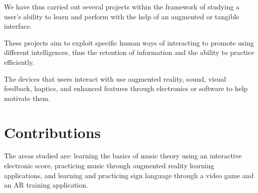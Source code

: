 We have thus carried out several projects within the framework of studying a user's ability to learn and perform with the help of an augmented or tangible interface.

These projects aim to exploit specific human ways of interacting to promote using different intelligences, thus the retention of information and the ability to practice efficiently. 

The devices that users interact with use augmented reality, sound, visual feedback, haptics, and enhanced features through electronics or software to help motivate them.

\section{Contributions}

The areas studied are: learning the basics of music theory using an interactive electronic score, practicing music through augmented reality learning applications, and learning and practicing sign language through a video game and an AR training application.